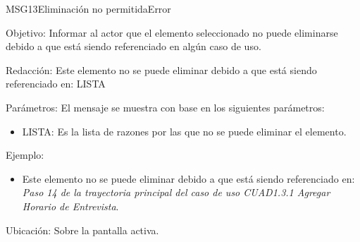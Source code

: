 \begin{mensaje}{MSG13}{Eliminación no permitida}{Error}
	\item [Objetivo:] Informar al actor que el elemento seleccionado no puede eliminarse debido a que está siendo referenciado en algún caso de uso.
	\item[Redacción:] Este elemento no se puede eliminar debido a que está siendo referenciado en: LISTA
	\item[Parámetros:] El mensaje se muestra con base en los siguientes parámetros:
	\begin{itemize}
		\item LISTA: Es la lista de razones por las que no se puede eliminar el elemento.
	\end{itemize}
	\item[Ejemplo:] \begin{itemize}
		\item Este elemento no se puede eliminar debido a que está siendo referenciado en: {\em Paso 14 de la trayectoria principal del caso de uso CUAD1.3.1 Agregar Horario de Entrevista}.
	\end{itemize}
	\item [Ubicación:] Sobre la pantalla activa.
\end{mensaje}